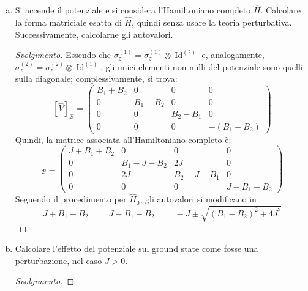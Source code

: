 \documentclass[11pt, a4paper]{scrartcl} %
\numberwithin{equation}{subsection}
\theoremstyle{style2}
\theoremstyle{style1}
\renewcommand\qedsymbol{$\blacksquare$}
\newenvironment{svolgimento}{\renewcommand\qedsymbol{$\spadesuit$}\begin{proof}[Svolgimento]}{\end{proof}}
\begin{document}
\begin{enumerate}[(a).]
Le autoenergie trovate, quindi, sono $J,J,J,-3J$; questo significa che, per $J>0$, lo stato fondamentale ha energia $-3J$ ed \`e un singoletto.
In questo caso, il comportamento del sistema \`e detto \textbf{anti-ferromagnetico}.

Se $J<0$, allora il sistema \`e detto \textbf{ferromagnetico} e il ground state ha energia $J$ e i tripletti che compongono lo stato fondamentale hanno spin diverso da 0 complessivamente, quindi il comportamento complessivo del sistema ha tendenze ferromangetiche.
\item Si accende il potenziale e si considera l'Hamiltoniano completo $\hat{H}$. 
	Calcolare la forma matriciale esatta di $\hat{H}$, quindi senza usare la teoria perturbativa.
	Successivamente, calcolarne gli autovalori.
	\begin{svolgimento}
		Essendo che $\sigma ^{(1)} _z = \sigma _z^{(1)} \otimes \operatorname{Id} ^{(2)}$ e, analogamente, $\sigma _z^{(2)}  =  \sigma _z^{(2)} \otimes \operatorname{Id} ^{(1)} $, gli unici elementi non nulli del potenziale sono quelli sulla diagonale; complessivamente, si trova:
		\begin{equation}\label{poth}
			[\hat{V}]_\mathcal{B} = \begin{pmatrix} B_1+B_2 &0&0&0\\ 0& B_1-B_2 &0&0\\0&0&B_2-B_1 &0\\0&0&0&-(B_1+B_2) \end{pmatrix} 
		\end{equation}
		Quindi, la matrice associata all'Hamiltoniano completo \`e:
		\begin{equation}
			[\hat{H}]_\mathcal{B} = \begin{pmatrix}  J + B_1+B_2 & 0 &0&0\\ 0 &B_1-J-B_2 & 2 J&0 \\ 0& 2J & B_2 -J - B_1 & 0 \\ 0& 0& 0& J - B_1-B_2\end{pmatrix} 
		\end{equation}
		Seguendo il procedimento per $\hat{H}_0$, gli autovalori si modificano in 
		\[
		J+B_1+B_2 \hspace{1cm} J - B_1 -B_2 \hspace{1cm}- J \pm\sqrt{(B_1-B_2)^2 + 4J^2} 
		\] 
	\end{svolgimento}
\item Calcolare l'effetto del potenziale sul ground state come fosse una perturbazione, nel caso $J > 0$.
	\begin{svolgimento}

\end{svolgimento}
\end{enumerate}
\end{document}
